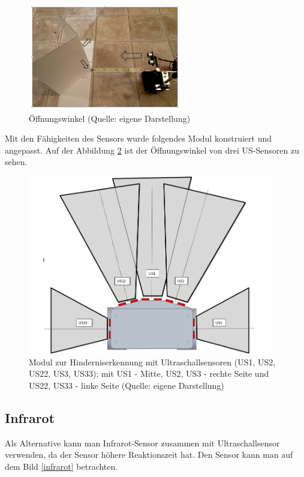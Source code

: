 \begin{figure}[!h]  %
	\centering\includegraphics[width=0.6\textwidth]{images/Bild-7.png}
	\caption{Öffnungswinkel (Quelle: eigene Darstellung)}
	\label{bild_7} %
\end{figure}

Mit den Fähigkeiten des Sensors wurde folgendes Modul konstruiert und angepasst. Auf der Abbildung \ref{H-Mod} ist der Öffnungswinkel von drei US-Sensoren zu sehen.

\begin{figure}[!h]  %
	\centering\includegraphics[width=0.95\textwidth]{images/H-Mod.jpg}
	\caption{Modul zur Hinderniserkennung mit Ultraschallsensoren (US1, US2, US22, US3, US33); mit US1 - Mitte, US2, US3 - rechte Seite und US22, US33 - linke Seite  (Quelle: eigene Darstellung)}
	\label{H-Mod} 
\end{figure}

\subsection{Infrarot}
Als Alternative kann man Infrarot-Sensor zusammen mit Ultraschallsensor verwenden, da der Sensor höhere Reaktionszeit hat. Den Sensor kann man auf dem  Bild \ref{infrarot} betrachten.

